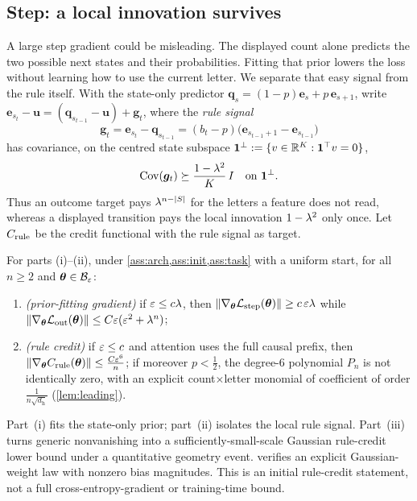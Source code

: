 \subsection{Step: a local innovation survives}
A large step gradient could be misleading. The displayed count alone predicts the two possible next states and their probabilities.
Fitting that prior lowers the loss without learning how to use the current letter. We separate that easy signal from the rule itself. With the
state-only predictor $\bm q_s=(1-p)\bm e_s+p\,\bm e_{s+1}$, write $\bm e_{s_t}-\bm u=(\bm q_{s_{t-1}}-\bm u)+\bm g_t$, where the
\emph{rule signal}
\[
 \bm g_t=\bm e_{s_t}-\bm q_{s_{t-1}}=(b_t-p)\bigl(\bm e_{s_{t-1}+1}-\bm e_{s_{t-1}}\bigr)
\]
has covariance, on the centred state subspace $\mathbf 1^\perp:=\{v\in\mathbb R^K:\mathbf 1^\top v=0\}$,
\begin{equation}
 \operatorname{Cov}(\bm g_t)\succeq\frac{1-\lambda^2}{K}\,I
 \quad\text{on }\mathbf 1^\perp.
 \label{eq:local-variation}
\end{equation}
Thus an outcome target pays $\lambda^{n-|S|}$ for the letters a feature does not read, whereas a displayed transition pays the
local innovation $1-\lambda^2$ only once. Let $C_{\mathrm{rule}}$ be the credit
functional with the rule signal as target.

\begin{theorem}
\label{thm:separation}
For parts (i)--(ii), under \cref{ass:arch,ass:init,ass:task} with a uniform start,
for all $n\ge2$ and $\bm\theta\in\mathcal B_{\varepsilon}$:
\begin{enumerate}[label=(\roman*),leftmargin=*,itemsep=0pt,topsep=2pt]
\item \emph{(prior-fitting gradient)} if $\varepsilon\le c\lambda$, then $\|\nabla_{\bm\theta}\mathcal L_{\mathrm{step}}(\bm\theta)\|\ge c\,\varepsilon\lambda$ while
$\|\nabla_{\bm\theta}\mathcal L_{\mathrm{out}}(\bm\theta)\|\le C\varepsilon(\varepsilon^2+\lambda^n)$;
\item \emph{(rule credit)} if $\varepsilon\le c$ and attention uses the full causal prefix, then $\|\nabla_{\bm\theta}C_{\mathrm{rule}}(\bm\theta)\|\le \frac{C\varepsilon^6}{n}$; if
moreover $p<\tfrac{1}{2}$, the degree-$6$ polynomial $P_n$ is not identically zero, with an explicit count$\times$letter monomial of
coefficient of order $\frac{1}{n\sqrt{d_{\mathrm h}}}$
(\cref{lem:leading}).

\end{enumerate}
\end{theorem}

Part~(i) fits the state-only prior; part~(ii) isolates the local rule signal.
Part~(iii) turns generic nonvanishing into a sufficiently-small-scale Gaussian rule-credit
lower bound under a quantitative geometry event. 
verifies an explicit Gaussian-weight law with nonzero bias magnitudes. This is an initial
rule-credit statement, not a full cross-entropy-gradient or training-time bound.

